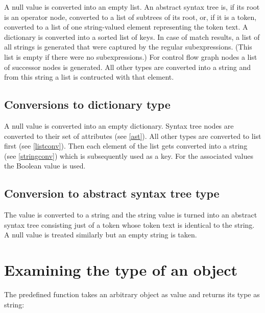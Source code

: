 \label{listconv}
A null value is converted into an empty list. An abstract syntax tree
is, if its root is an operator node, converted to a list of subtrees of
its root, or, if it is a token, converted to a list of one string-valued
element representing the token text. A dictionary is converted into a
sorted list of keys. In case of match results, a list of all strings
is generated that were captured by the regular subexpressions. (This
list is empty if there were no subexpressions.) For control flow graph
nodes a list of successor nodes is generated. All other types are
converted into a string and from this string a list is contructed with
that element.

\subsection{Conversions to dictionary type}

\label{dictconv}
A null value is converted into an empty dictionary. Syntax
tree nodes are converted to their set of attributes (see \ref{ast}).
All other types are converted to list first (see \ref{listconv}). Then
each element of the list gets converted into a string
(see \ref{stringconv}) which is subsequently used as a key.
For the associated values the Boolean value  is used.

\subsection{Conversion to abstract syntax tree type}

\label{treeconv}
The value is converted to a string and the string value is turned
into an abstract syntax tree consisting just of a token whose
token text is identical to the string. A null value is treated
similarly but an empty string is taken.

\section{Examining the type of an object}\label{exam-type}

The predefined function  takes an arbitrary object as
value and returns its type as string:

